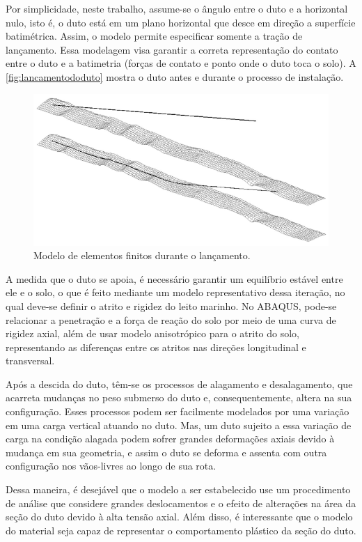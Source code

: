 Por simplicidade, neste trabalho, assume-se o ângulo entre o duto e a horizontal nulo, isto é, o duto está em um plano horizontal que desce em direção a superfície batimétrica.
Assim, o modelo permite especificar somente a tração de lançamento.
Essa modelagem visa garantir a correta representação do contato entre o duto e a batimetria (forças de contato e ponto onde o duto toca o solo).
A \autoref{fig:lancamentododuto} mostra o duto antes e durante o processo de instalação.

\begin{figure}[!ht]
    \centering
    \caption{Modelo de elementos finitos durante o lançamento.}\label{fig:lancamentododuto}
    \includegraphics[width=0.7\linewidth]{imagens/lancamento_do_duto}
\end{figure}

A medida que o duto se apoia, é necessário garantir um equilíbrio estável entre ele e o solo, o que é feito mediante um modelo representativo dessa iteração, no qual deve-se definir o atrito e rigidez do leito marinho.
No ABAQUS, pode-se relacionar a penetração e a força de reação do solo por meio de uma curva de rigidez axial, além de usar modelo anisotrópico para o atrito do solo, representando as diferenças entre os atritos nas direções longitudinal e transversal.

Após a descida do duto, têm-se os processos de alagamento e desalagamento, que acarreta mudanças no peso submerso do duto e, consequentemente, altera na sua configuração.
Esses processos podem ser facilmente modelados por uma variação em uma carga vertical atuando no duto.
Mas, um duto sujeito a essa variação de carga na condição alagada podem sofrer grandes deformações axiais devido à mudança em sua geometria, e assim o duto se deforma e assenta com outra configuração nos vãos-livres ao longo de sua rota.

Dessa maneira, é desejável que o modelo a ser estabelecido use um procedimento de análise que considere grandes deslocamentos e o efeito de alterações na área da seção do duto devido à alta tensão axial.
Além disso, é interessante que o modelo do material seja capaz de representar o comportamento plástico da seção do duto.

